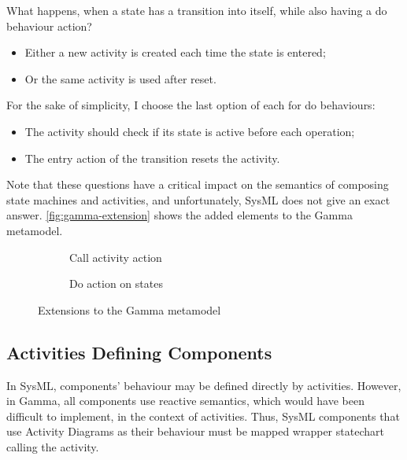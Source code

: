 What happens, when a state has a transition into itself, while also having a do behaviour action?

\begin{itemize}
	\item Either a new activity is created each time the state is entered;
	\item Or the same activity is used after reset.
\end{itemize}

For the sake of simplicity, I choose the last option of each for do behaviours:

\begin{itemize}
	\item The activity should check if its state is active before each operation;
	\item The entry action of the transition resets the activity.
\end{itemize}

Note that these questions have a critical impact on the semantics of composing state machines and activities, and unfortunately, SysML does not give an exact answer. \autoref{fig:gamma-extension} shows the added elements to the Gamma metamodel.

\begin{figure}[!ht]
	\begin{subfigure}{.66\textwidth}
		\centering
		
		\caption{Call activity action}
	\end{subfigure}%
	\begin{subfigure}{.33\textwidth}
		\centering
		
		\caption{Do action on states}
	\end{subfigure}
	\caption{Extensions to the Gamma metamodel}
	\label{fig:gamma-extension}
\end{figure}

\subsection{Activities Defining Components}

In SysML, components' behaviour may be defined directly by activities. However, in Gamma, all components use reactive semantics, which would have been difficult to implement, in the context of activities. Thus, SysML components that use Activity Diagrams as their behaviour must be mapped wrapper statechart calling the activity.

